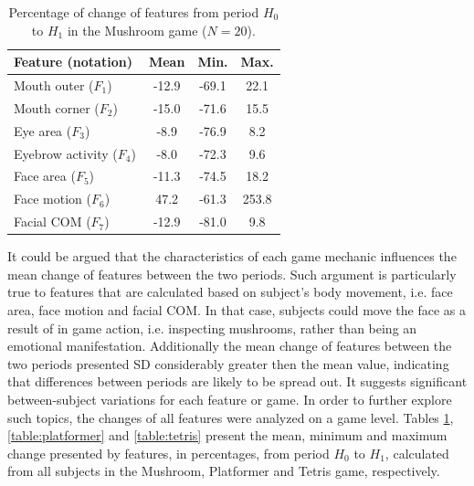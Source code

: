 \begin{table}
    \caption{Percentage of change of features from period $H_0$ to $H_1$ in the Mushroom game ($N=20$).}
    \label{table:mushroom}
    \centering
    \begin{threeparttable}
        \begin{tabular}{lccc}
            \hline
                \textbf{Feature (notation)} & \textbf{Mean} & \textbf{Min.} & \textbf{Max.} \\
            \hline
                Mouth outer ($F_1$)      & -12.9 & -69.1  &  22.1  \\
                Mouth corner ($F_2$)     & -15.0 & -71.6  &  15.5  \\
            \hline
                Eye area ($F_3$)         & -8.9  & -76.9  &  8.2   \\
                Eyebrow activity ($F_4$) & -8.0  & -72.3  &  9.6   \\
            \hline
                Face area ($F_5$)        & -11.3 & -74.5  &  18.2  \\
                Face motion ($F_6$)      & 47.2  & -61.3  &  253.8 \\
                Facial COM ($F_7$)       & -12.9 & -81.0  &  9.8   \\
            \hline
        \end{tabular}
        \begin{tablenotes}
          \small
          \item[]{}
        \end{tablenotes}
    \end{threeparttable}
\end{table}

It could be argued that the characteristics of each game mechanic influences the mean change of features between the two periods. Such argument is particularly true to features that are calculated based on subject's body movement, i.e. face area, face motion and facial COM. In that case, subjects could move the face as a result of in game action, i.e. inspecting mushrooms, rather than being an emotional manifestation. Additionally the mean change of features between the two periods presented SD considerably greater then the mean value, indicating that differences between periods are likely to be spread out. It suggests significant between-subject variations for each feature or game. In order to further explore such topics, the changes of all features were analyzed on a game level. Tables \ref{table:mushroom}, \ref{table:platformer} and \ref{table:tetris} present the mean, minimum and maximum change presented by features, in percentages, from period $H_0$ to $H_1$, calculated from all subjects in the Mushroom, Platformer and Tetris game, respectively.

